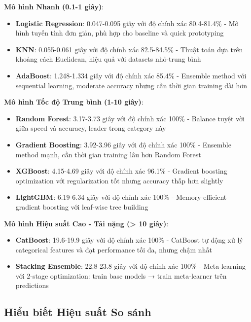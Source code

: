 \textbf{Mô hình Nhanh (0.1-1 giây)}:
\begin{itemize}
    \item \textbf{Logistic Regression}: 0.047-0.095 giây với độ chính xác 80.4-81.4\% - Mô hình tuyến tính đơn giản, phù hợp cho baseline và quick prototyping
    \item \textbf{KNN}: 0.055-0.061 giây với độ chính xác 82.5-84.5\% - Thuật toán dựa trên khoảng cách Euclidean, hiệu quả với datasets nhỏ-trung bình
    \item \textbf{AdaBoost}: 1.248-1.334 giây với độ chính xác 85.4\% - Ensemble method với sequential learning, moderate accuracy nhưng cần thời gian training dài hơn
\end{itemize}

\textbf{Mô hình Tốc độ Trung bình (1-10 giây)}:
\begin{itemize}
    \item \textbf{Random Forest}: 3.17-3.73 giây với độ chính xác 100\% - Balance tuyệt vời giữa speed và accuracy, leader trong category này
    \item \textbf{Gradient Boosting}: 3.92-3.96 giây với độ chính xác 100\% - Ensemble method mạnh, cần thời gian training lâu hơn Random Forest  
    \item \textbf{XGBoost}: 4.15-4.69 giây với độ chính xác 96.1\% - Gradient boosting optimization với regularization tốt nhưng accuracy thấp hơn slightly
    \item \textbf{LightGBM}: 6.19-6.34 giây với độ chính xác 100\% - Memory-efficient gradient boosting với leaf-wise tree building
\end{itemize}

\textbf{Mô hình Hiệu suất Cao - Tải nặng (> 10 giây)}:
\begin{itemize}
    \item \textbf{CatBoost}: 19.6-19.9 giây với độ chính xác 100\% - CatBoost tự động xử lý categorical features và đạt performance tối đa, nhưng chậm nhất
    \item \textbf{Stacking Ensemble}: 22.8-23.8 giây với độ chính xác 100\% - Meta-learning với 2-stage optimization: train base models → train meta-learner trên predictions
\end{itemize}

\subsection{Hiểu biết Hiệu suất So sánh}\label{subsec:comparative-insights}

